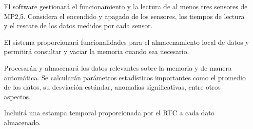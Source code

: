 \documentclass[
11pt, %
codirector, %
]{charter}
\makeatletter
\newcommand{\mytwodigits}[1]{\two@digits{#1}}
\newcounter{reqCounter}
\makeatother
\begin{document}
\begin{description}
	
	\item[\textbf{[\CODrequerimiento\mytwodigits{\value{reqCounter}}]}] El software gestionará el funcionamiento y la lectura de al menos tres sensores de MP2,5. Considera el encendido y apagado de los sensores, los tiempos de lectura y el rescate de los datos medidos por cada sensor.

	\item[\textbf{[\CODrequerimiento\mytwodigits{\value{reqCounter}}]}] El sistema proporcionará funcionalidades para el almacenamiento local de datos y permitirá consultar y vaciar la memoria cuando sea necesario.

	\item[\textbf{[\CODrequerimiento\mytwodigits{\value{reqCounter}}]}] Procesarán y almacenará los datos relevantes sobre la memoria y de manera automática. Se calcularán parámetros estadísticos importantes como el promedio de los datos, su desviación estándar, anomalías significativas, entre otros aspectos.

	\item[\textbf{[\CODrequerimiento\mytwodigits{\value{reqCounter}}]}] Incluirá una estampa temporal proporcionada por el RTC a cada dato almacenado.

	
\end{description}
\end{document}
